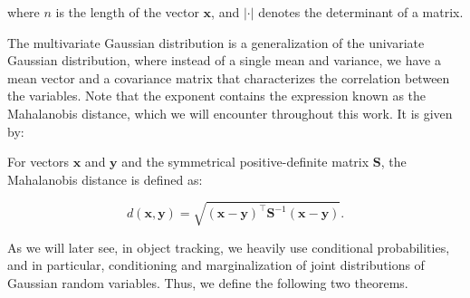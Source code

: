 where $n$ is the length of the vector $\mathbf{x}$, and $|\cdot|$ denotes the determinant of a matrix. 

The multivariate Gaussian distribution is a generalization of the univariate Gaussian distribution, where instead of a single mean and variance, we have a mean vector and a covariance matrix that characterizes the correlation between the variables. Note that the exponent contains the expression known as the Mahalanobis distance, which we will encounter throughout this work. It is given by:

\begin{definition}\label{def:mahalanobis}
    For vectors $\mathbf x$ and $\mathbf y$ and the symmetrical positive-definite matrix $\mathbf S$, the Mahalanobis distance is defined as:

    \begin{equation}
        d(\mathbf x, \mathbf y) 
        = \sqrt{
            (\mathbf x - \mathbf y)^\intercal
            \mathbf{S}^{-1}
            (\mathbf x - \mathbf y)
        }.
    \end{equation}
\end{definition}

As we will later see, in object tracking, we heavily use conditional probabilities, and in particular, conditioning and marginalization of joint distributions of Gaussian random variables. Thus, we define the following two theorems.


